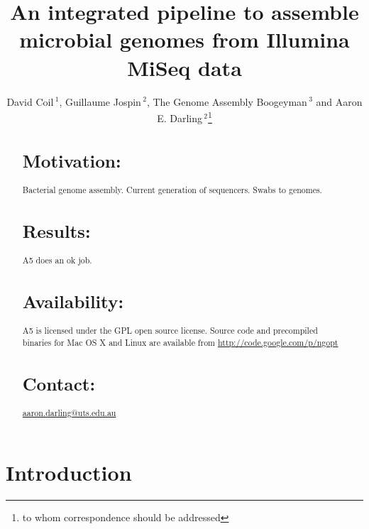 \documentclass{bioinfo}
\begin{document}

\title[A5-miseq]{An integrated pipeline to assemble microbial genomes from Illumina MiSeq data}
\author[Coil \textit{et~al}]{David Coil\,$^{1}$, Guillaume Jospin\,$^{2}$, The Genome Assembly Boogeyman\,$^{3}$ and Aaron E. Darling\,$^{2}$\footnote{to whom correspondence should be addressed}}
\address{$^{1}$Genome Center, University of California Davis, USA\\
$^{2}$ithree institute, University of Technology Syndey, Australia\\
$^{3}$hiding in your "ultrapure" reagents}




\maketitle

\begin{abstract}

\section{Motivation:}
Bacterial genome assembly. 
Current generation of sequencers.
Swabs to genomes.

\section{Results:}
A5 does an ok job.

\section{Availability:}
A5 is licensed under the GPL open source license. Source code and precompiled binaries for Mac OS X and Linux are available from \url{http://code.google.com/p/ngopt}

\section{Contact:} \href{aaron.darling@uts.edu.au}{aaron.darling@uts.edu.au}
\end{abstract}

\section{Introduction}
\end{document}

